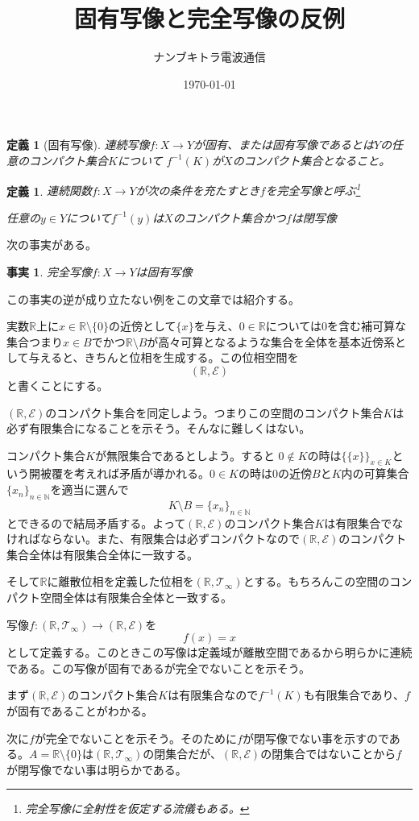 \documentclass[leqno]{jsarticle}
\title{固有写像と完全写像の反例}
\author{ナンブキトラ電波通信}
\date{\today}
\newtheorem{df}[thm]{定義}
\newtheorem{fact}[thm]{事実}
\newcommand{\nn}{\mathbb{N}}
\newcommand{\rr}{\mathbb{R}}
\newcommand{\mgn}{\infty}
\begin{document}
\maketitle


\begin{df}[固有写像]
連続写像$f:X\to Y$が固有、または固有写像であるとは$Y$の任意のコンパクト集合$K$について
$f^{-1}(K)$が$X$のコンパクト集合となること。
\end{df}

\begin{df}連続関数$f:X\to Y$が次の条件を充たすとき$f$を完全写像と呼ぶ\footnote{完全写像に全射性を仮定する流儀もある。}
\begin{center}
任意の$y\in Y$について$f^{-1}(y)$は$X$のコンパクト集合かつ$f$は閉写像
\end{center}
\end{df}


次の事実がある。
\begin{fact}
完全写像$f:X\to Y$は固有写像
\end{fact}

この事実の逆が成り立たない例をこの文章では紹介する。


実数$\rr$上に$x\in \rr\setminus \{0\}$の近傍として$\{x\}$を与え、$0\in \rr$については$0$を含む補可算な集合つまり$x\in B$でかつ$\rr\setminus B$が高々可算となるような集合を全体を基本近傍系として与えると、きちんと位相を生成する。この位相空間を
\[
(\rr,\mathcal{E})
\]
と書くことにする。\par
$(\rr,\mathcal{E})$のコンパクト集合を同定しよう。つまりこの空間のコンパクト集合$K$は必ず有限集合になることを示そう。そんなに難しくはない。
\par
コンパクト集合$K$が無限集合であるとしよう。すると
$0\not\in K$の時は$\{\{x\}\}_{x\in K}$という開被覆を考えれば矛盾が導かれる。$0\in K$の時は$0$の近傍$B$と$K$内の可算集合$\{x_n\}_{n\in \nn}$を適当に選んで
\[
K\setminus B=\{x_n\}_{n\in \nn}
\]
とできるので結局矛盾する。よって$(\rr,\mathcal{E})$のコンパクト集合$K$は有限集合でなければならない。また、有限集合は必ずコンパクトなので$(\rr,\mathcal{E})$のコンパクト集合全体は有限集合全体に一致する。
\par
そして$\rr$に離散位相を定義した位相を$(\rr,\mathcal{T}_{\mgn})$とする。もちろんこの空間のコンパクト空間全体は有限集合全体と一致する。\par
写像$f:(\rr,\mathcal{T}_{\mgn})\to (\rr,\mathcal{E})$を
\[
f(x)=x
\]
として定義する。このときこの写像は定義域が離散空間であるから明らかに連続である。この写像が固有であるが完全でないことを示そう。\par
まず$(\rr,\mathcal{E})$のコンパクト集合$K$は有限集合なので$f^{-1}(K)$も有限集合であり、$f$が固有であることがわかる。\par
次に$f$が完全でないことを示そう。そのために$f$が閉写像でない事を示すのである。$A=\rr\setminus \{0\}$は$(\rr,\mathcal{T}_{\mgn})$の閉集合だが、$(\rr,\mathcal{E})$の閉集合ではないことから$f$が閉写像でない事は明らかである。
\end{document}
